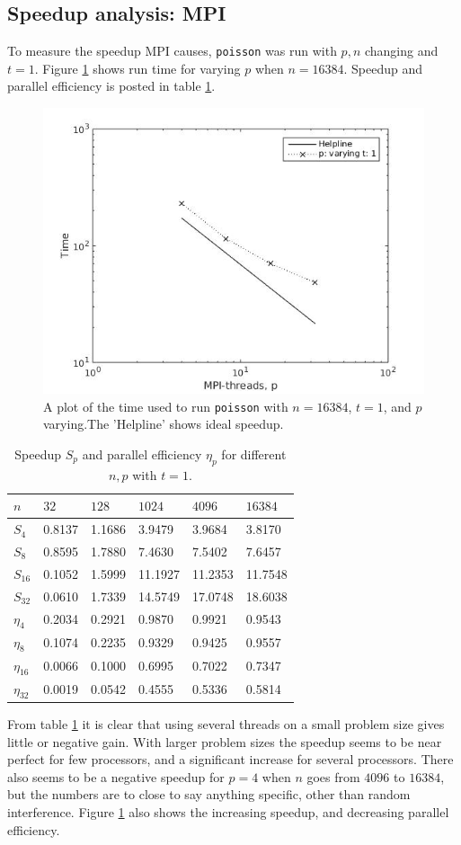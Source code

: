 \documentclass{article}
\begin{document}
\subsection{Speedup analysis: MPI} \label{sec:spup}
To measure the speedup MPI causes, \texttt{poisson} was run with $p,n$ changing and $t=1$. Figure \ref{fig:mpi} shows run time for varying $p$ when $n = 16384$. Speedup and parallel efficiency is posted in table \ref{tab:mpi}.
\begin{figure}[h]
    \centering
    \includegraphics[width = 0.6\linewidth]{mpi}
    \caption{A plot of the time used to run \texttt{poisson} with $n = 16384$, $t = 1$, and $p$ varying.The 'Helpline' shows ideal speedup.}
    \label{fig:mpi}
\end{figure}
\begin{table}[]
\centering
\begin{tabular}{l|lllll}
$n$ & $32$ & $128$ & $1024$ & $4096$ & $16384$ \\ 
\hline
$S_4$ & 0.8137  & 1.1686  &  3.9479 & 3.9684& 3.8170 \\
$S_8$ & 0.8595 & 1.7880 & 7.4630 & 7.5402&   7.6457\\
$S_{16}$ &0.1052 & 1.5999& 11.1927 & 11.2353&  11.7548\\
$S_{32}$ &  0.0610&1.7339& 14.5749 & 17.0748& 18.6038\\
\hline
$\eta_4$ & 0.2034  &  0.2921&    0.9870&    0.9921 &   0.9543\\
$\eta_8$ &     0.1074 &   0.2235    &0.9329   & 0.9425&    0.9557\\
$\eta_{16}$&   0.0066  &  0.1000 &   0.6995  &  0.7022 &   0.7347\\
$\eta_{32}$& 0.0019  &  0.0542&    0.4555  &  0.5336 &   0.5814\\
\end{tabular}
\caption{Speedup $S_p$ and parallel efficiency $\eta_p$ for different $n,p$ with $t=1$.}
\label{tab:mpi}
\end{table}
From table \ref{tab:mpi} it is clear that using several threads on a small problem size gives little or negative gain. With larger problem sizes the speedup seems to be near perfect for few processors, and a significant increase for several processors. There also seems to be a negative speedup for $p = 4$ when $n$ goes from $4096$ to $16384$, but the numbers are to close to say anything specific, other than random interference. Figure \ref{fig:mpi} also shows the increasing speedup, and decreasing parallel efficiency.
\end{document}
